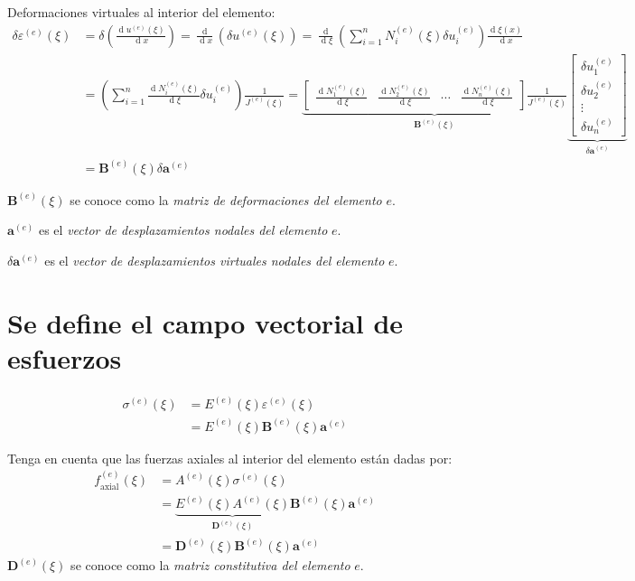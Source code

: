 \documentclass[12pt,letterpaper]{article}
\newcommand{\ve}[1]{{\boldsymbol{#1}}}
\newcommand{\ma}[1]{{\boldsymbol{#1}}}
\newcommand{\dd}{\operatorname{d} \!}
\begin{document}
Deformaciones virtuales al interior del elemento:
\begin{align}
\delta \varepsilon^{(e)}(\xi) &= \delta \left(\frac{\dd u^{(e)}(\xi)}{\dd x}\right) = \frac{\dd}{\dd x}\left(\delta u^{(e)}(\xi)\right)
= \frac{\dd}{\dd \xi}\left(\sum_{i=1}^n N_i^{(e)}(\xi) \delta u_i^{(e)}\right)\frac{\dd \xi(x)}{\dd x} \\
&= \left(\sum_{i=1}^n \frac{\dd N_i^{(e)}(\xi)}{\dd \xi} \delta u_i^{(e)}\right)\frac{1}{J^{(e)}(\xi)} = 
\underbrace{\begin{bmatrix}
   \frac{\dd N_1^{(e)}(\xi)}{\dd \xi} & \frac{\dd N_2^{(e)}(\xi)}{\dd \xi} & \cdots & \frac{\dd N_n^{(e)}(\xi)}{\dd \xi}
   \end{bmatrix} \frac{1}{J^{(e)}(\xi)} }_{\ma{B}^{(e)}(\xi)}
\underbrace{\begin{bmatrix}
  \delta u_1^{(e)} \\ \delta u_2^{(e)} \\ \vdots \\ \delta u_n^{(e)} 
   \end{bmatrix}}_{\delta \ma{a}^{(e)}} \\
&= \ma{B}^{(e)}(\xi) \delta \ve{a}^{(e)}
\end{align}

$\ma{B}^{(e)}(\xi)$ se conoce como la \emph{matriz de deformaciones del elemento} $e$.

$\ve{a}^{(e)}$ es el \emph{vector de desplazamientos nodales del elemento} $e$.

$\delta\ve{a}^{(e)}$ es el \emph{vector de desplazamientos virtuales nodales del elemento} $e$.

\newpage
\section{Se define el campo vectorial de esfuerzos}
\begin{align}
\sigma^{(e)}(\xi) 
&= E^{(e)}(\xi) \varepsilon^{(e)}(\xi) \\
&= E^{(e)}(\xi) \ma{B}^{(e)}(\xi) \ve{a}^{(e)}
\end{align}

Tenga en cuenta que las fuerzas axiales al interior del elemento están dadas por:
\begin{align}
f^{(e)}_{\text{axial}}(\xi) 
&= A^{(e)}(\xi) \sigma^{(e)}(\xi) \\
&= \underbrace{E^{(e)}(\xi) A^{(e)}(\xi)}_{\ma{D}^{(e)}(\xi)} \ma{B}^{(e)}(\xi) \ve{a}^{(e)} \\
&= \ma{D}^{(e)}(\xi) \ma{B}^{(e)}(\xi) \ve{a}^{(e)}
\end{align}
$\ma{D}^{(e)}(\xi)$ se conoce como la \emph{matriz constitutiva del elemento} $e$.
\end{document}
